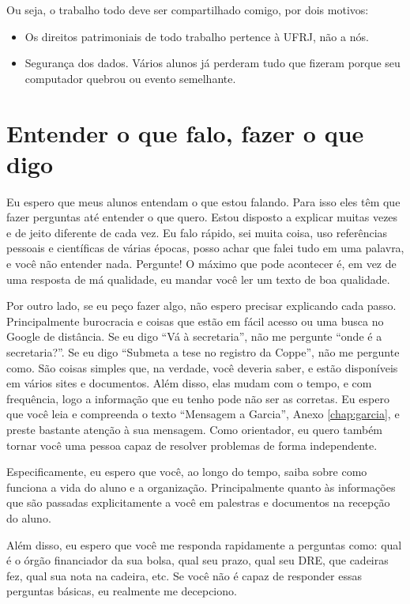 Ou seja, o trabalho todo deve ser compartilhado comigo, por dois motivos:
\begin{itemize}
    \item Os direitos patrimoniais de todo trabalho pertence à UFRJ, não a nós. 
    \item Segurança dos dados. Vários alunos já perderam tudo que fizeram porque seu computador quebrou ou evento semelhante.
\end{itemize}

\section{Entender o que falo, fazer o que digo}

Eu espero que meus alunos entendam o que estou falando. Para isso eles têm que fazer perguntas até entender o que quero. Estou disposto a explicar muitas vezes e de jeito diferente de cada vez. Eu falo rápido, sei muita coisa, uso referências pessoais e científicas de várias épocas, posso achar que falei tudo em uma palavra, e você não entender nada. Pergunte! O máximo que pode acontecer é, em vez de uma resposta de má qualidade, eu mandar você ler um texto de boa qualidade.

Por outro lado, se eu peço fazer algo, não espero precisar explicando cada passo. Principalmente burocracia e coisas que estão em fácil acesso ou uma busca no Google de distância. Se eu digo ``Vá à secretaria'', não me pergunte ``onde é a secretaria?''. Se eu digo ``Submeta a tese no registro da Coppe'', não me pergunte como. São coisas simples que, na verdade, você deveria saber, e estão disponíveis em vários sites e documentos. Além disso, elas mudam com o tempo, e com frequência, logo a informação que eu tenho pode não ser as corretas. Eu espero que você leia e compreenda o texto ``Mensagem a Garcia'', Anexo \ref{chap:garcia}, e preste bastante atenção à sua mensagem. Como orientador, eu quero também tornar você uma pessoa capaz de resolver problemas de forma independente.

Especificamente, eu espero que você, ao longo do tempo, saiba sobre como funciona a vida do aluno e a organização. Principalmente quanto às informações que são passadas explicitamente a você em palestras e documentos na recepção do aluno.

Além disso, eu espero que você me responda rapidamente a perguntas como: qual é o órgão financiador da sua bolsa, qual seu prazo, qual seu DRE, que cadeiras fez, qual sua nota na cadeira, etc. Se você não é capaz de responder essas perguntas básicas, eu realmente me decepciono.



